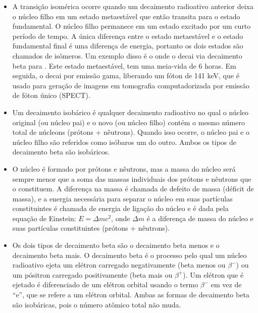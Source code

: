 \documentclass[11pt,a4paper]{article}
\newcounter{exemplo}
\begin{document}
\begin{exemplo}
\begin{itemize}
	   \item A transição isomérica ocorre quando um decaimento radioativo anterior deixa o núcleo filho em um estado metaestável que então transita para o estado fundamental. O núcleo filho permanece em um estado excitado por um curto período de tempo. A única diferença entre o estado metaestável e o estado fundamental final é uma diferença de energia, portanto os dois estados são chamados de isômeros. Um exemplo disso é o  onde o  decai via decaimento beta para . Este estado metaestável, tem uma meia-vida de 6 horas. Em seguida, o  decai por emissão gama, liberando um fóton de 141 keV, que é usado para geração de imagens em tomografia computadorizada por emissão de fóton único (SPECT).
	   
	   \item Um decaimento isobárico é qualquer decaimento radioativo no qual o núcleo original (ou núcleo pai) e o novo (ou núcleo filho) contém o mesmo número total de núcleons (prótons + nêutrons). Quando isso ocorre, o núcleo pai e o núcleo filho são referidos como isóbaros um do outro. Ambos os tipos de decaimento beta são isobáricos.
	   
	   \item O núcleo é formado por prótons e nêutrons, mas a massa do núcleo será sempre menor que a soma das massas individuais dos prótons e nêutrons que o constituem. A diferença na massa é chamada de defeito de massa (déficit de massa), e a energia necessária para separar o núcleo em suas partículas constituintes é chamada de energia de ligação do núcleo e é dada pela equação de Einstein: $E = \Delta mc^2$, onde $\Delta m$ é a diferença de massa do núcleo e suas partículas constituintes (prótons + nêutrons).
	   
	   \item Os dois tipos de decaimento beta são o decaimento beta menos e o decaimento beta mais. O decaimento beta é o processo pelo qual um núcleo radioativo ejeta um elétron carregado negativamente (beta menos ou $\beta^-$) ou um pósitron carregado positivamente (beta mais ou $\beta^+$). Um elétron que é ejetado é diferenciado de um elétron orbital usando o termo $\beta^-$ em vez de “e”, que se refere a um elétron orbital. Ambas as formas de decaimento beta são isobáricas, pois o número atômico total não muda.
	   

\end{itemize}
\end{exemplo}
\end{document}
